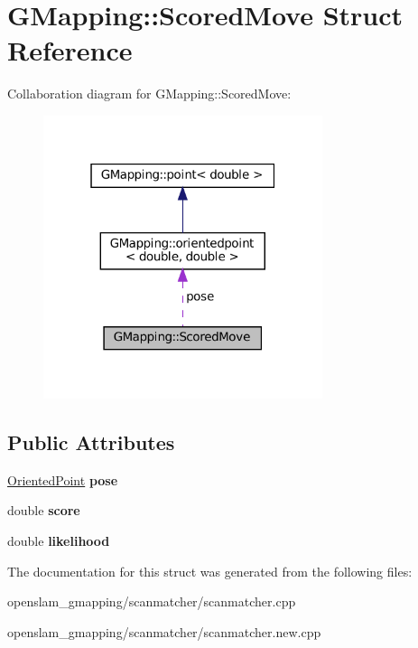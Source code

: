 \hypertarget{structGMapping_1_1ScoredMove}{}\section{G\+Mapping\+:\+:Scored\+Move Struct Reference}
\label{structGMapping_1_1ScoredMove}


Collaboration diagram for G\+Mapping\+:\+:Scored\+Move\+:
\nopagebreak
\begin{figure}[H]
\begin{center}
\leavevmode
\includegraphics[width=232pt]{structGMapping_1_1ScoredMove__coll__graph}
\end{center}
\end{figure}
\subsection*{Public Attributes}
\begin{DoxyCompactItemize}
\item 
\mbox{\label{structGMapping_1_1ScoredMove_a72a979fe3f8b75bd9b2f3e791378c819}} 
\hyperlink{structGMapping_1_1orientedpoint}{Oriented\+Point} {\bfseries pose}
\item 
\mbox{\label{structGMapping_1_1ScoredMove_a6091d2d4c61527e89144ddbcb3280ff9}} 
double {\bfseries score}
\item 
\mbox{\label{structGMapping_1_1ScoredMove_a32ac73deb5679280d548aca3b0d244a9}} 
double {\bfseries likelihood}
\end{DoxyCompactItemize}


The documentation for this struct was generated from the following files\+:\begin{DoxyCompactItemize}
\item 
openslam\+\_\+gmapping/scanmatcher/scanmatcher.\+cpp\item 
openslam\+\_\+gmapping/scanmatcher/scanmatcher.\+new.\+cpp\end{DoxyCompactItemize}
